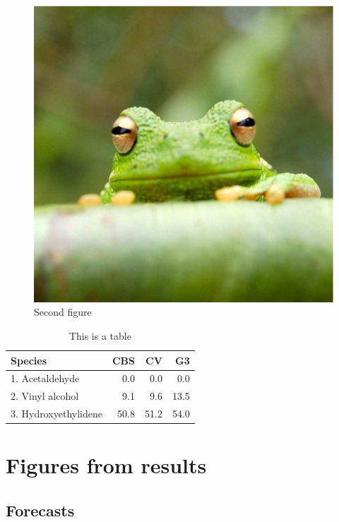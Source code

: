 \documentclass[9pt,twoside,lineno]{pnas-new}
\begin{document}
\begin{figure}
\centering
\includegraphics[width=\textwidth]{pnas-materials/frog}
\caption{Second figure}
\end{figure}

\begin{table}\centering
\caption{This is a table}

\begin{tabular}{lrrr}
Species & CBS & CV & G3 \\
\midrule
1. Acetaldehyde & 0.0 & 0.0 & 0.0 \\
2. Vinyl alcohol & 9.1 & 9.6 & 13.5 \\
3. Hydroxyethylidene & 50.8 & 51.2 & 54.0\\
\bottomrule
\end{tabular}
\end{table}


\clearpage

\hypertarget{figures-from-results}{%
\section{Figures from results}\label{figures-from-results}}

\hypertarget{forecasts}{%
\subsection{Forecasts}\label{forecasts}}
\end{document}
